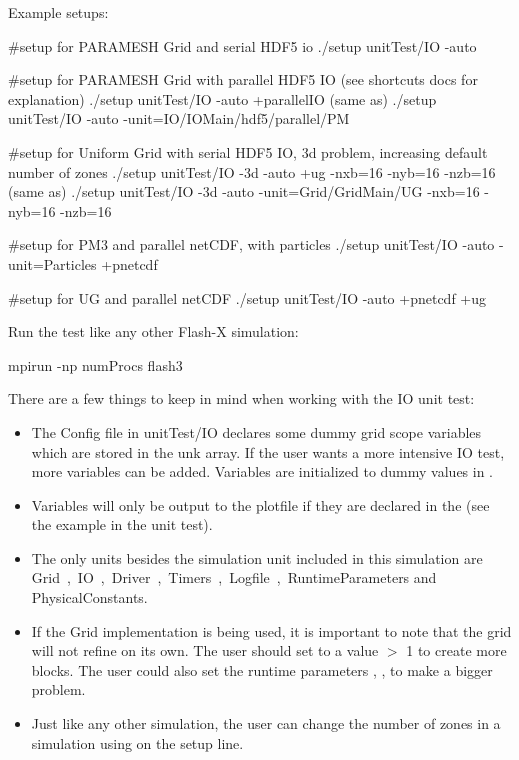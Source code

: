 Example setups:

\begin{codeseg}
#setup for PARAMESH Grid and serial HDF5 io
./setup unitTest/IO -auto

#setup for PARAMESH Grid with parallel HDF5 IO (see shortcuts docs for explanation)
./setup unitTest/IO -auto +parallelIO     (same as)
./setup unitTest/IO -auto -unit=IO/IOMain/hdf5/parallel/PM

#setup for Uniform Grid with serial HDF5 IO, 3d problem, increasing default number of zones
./setup unitTest/IO -3d -auto +ug -nxb=16 -nyb=16 -nzb=16  (same as)
./setup unitTest/IO -3d -auto -unit=Grid/GridMain/UG -nxb=16 -nyb=16 -nzb=16


#setup for PM3 and parallel netCDF, with particles
./setup unitTest/IO -auto -unit=Particles +pnetcdf


#setup for UG and parallel netCDF
./setup unitTest/IO -auto +pnetcdf +ug
\end{codeseg}

Run the test like any other Flash-X simulation:
\begin{codeseg}
mpirun -np numProcs flash3
\end{codeseg}

There are a few things to keep in mind when working with the IO unit test:
\begin{itemize}
\item The Config file in unitTest/IO declares some dummy grid scope
variables which are stored in the unk array.  If the user wants a more
intensive IO test, more variables can be added.  Variables are
initialized to dummy values in . 

\item Variables will only be output to the plotfile if they are declared in
the  (see the example  in the unit test).

\item The only units besides the simulation unit included in this
simulation are \unit{Grid, IO, Driver, Timers, Logfile, RuntimeParameters}
and \unit{PhysicalConstants}. 

\item If the \Paramesh Grid implementation is being used, it is important to
note that the grid will not refine on its own.  The user should set
 to a value $>$ 1 to create more blocks.  The user could also
set the runtime parameters , ,  to make a bigger
problem. 

\item Just like any other simulation, the user can change the number of
zones in a simulation using  on the setup line.
\end{itemize}




